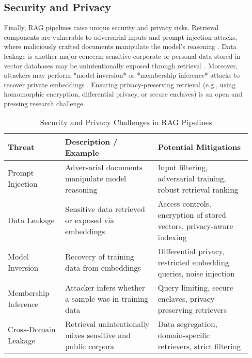 \documentclass[conference]{IEEEtran}
\begin{document}
\subsection{Security and Privacy}
Finally, RAG pipelines raise unique security and privacy risks. Retrieval components are vulnerable to adversarial inputs and prompt injection attacks, where maliciously crafted documents manipulate the model’s reasoning \cite{greshake2023morethan}. Data leakage is another major concern: sensitive corporate or personal data stored in vector databases may be unintentionally exposed through retrieval \cite{shejwalkar2023privacyrag}. Moreover, attackers may perform *model inversion* or *membership inference* attacks to recover private embeddings \cite{carlini2021extracting}. Ensuring privacy-preserving retrieval (e.g., using homomorphic encryption, differential privacy, or secure enclaves) is an open and pressing research challenge.

\begin{table}[ht]
\caption{Security and Privacy Challenges in RAG Pipelines}
\label{tab:security_privacy}
\renewcommand{\arraystretch}{1.2}
\begin{tabularx}{\linewidth}{p{3cm} X X}
\toprule
\textbf{Threat} & \textbf{Description / Example} & \textbf{Potential Mitigations} \\
\midrule
Prompt Injection & Adversarial documents manipulate model reasoning \cite{greshake2023morethan} & Input filtering, adversarial training, robust retrieval ranking \\
\midrule
Data Leakage & Sensitive data retrieved or exposed via embeddings \cite{shejwalkar2023privacyrag} & Access controls, encryption of stored vectors, privacy-aware indexing \\
\midrule
Model Inversion & Recovery of training data from embeddings \cite{carlini2021extracting} & Differential privacy, restricted embedding queries, noise injection \\
\midrule
Membership Inference & Attacker infers whether a sample was in training data & Query limiting, secure enclaves, privacy-preserving retrievers \\
\midrule
Cross-Domain Leakage & Retrieval unintentionally mixes sensitive and public corpora & Data segregation, domain-specific retrievers, strict filtering \\
\bottomrule
\end{tabularx}
\end{table}


\end{document}
